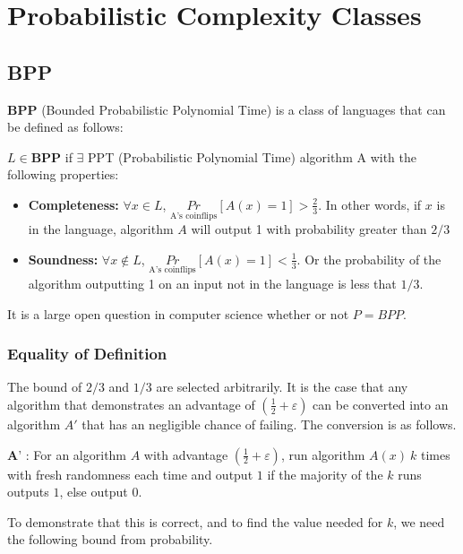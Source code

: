 \documentclass[11pt]{article}
\begin{document}
\section{Probabilistic Complexity Classes}
\subsection{BPP}
\textbf{BPP} (Bounded Probabilistic Polynomial Time) is a class of languages that can be defined as follows:
\vspace{1em}

$L \in \textbf{BPP}$ if $\exists$ PPT (Probabilistic Polynomial Time) algorithm A with the following properties:
\begin{itemize}
    \item \textbf{Completeness:} $\forall x \in L$, $\underset{\text{A's coinflips}}{Pr}$$[A(x) = 1] > \frac{2}{3}$. In other words, if $x$ is in the language, algorithm $A$ will output 1 with probability greater than $2/3$
    \item \textbf{Soundness:} $\forall x \notin L$, $\underset{\text{A's coinflips}}{Pr}$$[A(x) = 1] < \frac{1}{3}$. Or the probability of the algorithm outputting 1 on an input not in the language is less that $1/3$.
\end{itemize}
It is a large open question in computer science whether or not $P = BPP$.
\subsubsection{Equality of Definition}
The bound of $2/3$ and $1/3$ are selected arbitrarily. It is the case that any algorithm that demonstrates an advantage of $(\frac{1}{2} + \varepsilon)$ can be converted into an algorithm $A'$ that has an negligible chance of failing. The conversion is as follows.
\vspace{1em}

$\textbf{A'}$ : For an algorithm $A$ with advantage $(\frac{1}{2} + \varepsilon)$, run algorithm $A(x) \ k$ times with fresh randomness each time and output $1$ if the majority of the $k$ runs outputs $1$, else output $0$.
\vspace{1em}

To demonstrate that this is correct, and to find the value needed for $k$, we need the following bound from probability.
\vspace{1em}
\end{document}
